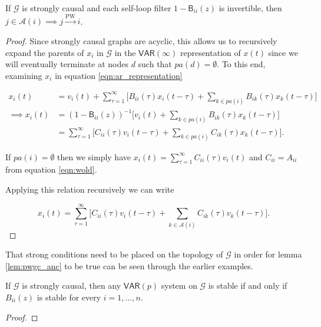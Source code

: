 \documentclass[12pt]{article}
\def\pwgc{\overset{\text{PW}}{\rightarrow}}  %
\def\gcg{\mathcal{G}}  %
\def\VAR{\mathsf{VAR}}  %
\def\B{\mathsf{B}}  %
\newcommand{\pa}[1]{pa(#1)}  %
\newcommand{\anc}[1]{\mathcal{A}(#1)}  %
\begin{document}
\begin{proposition}
  \label{lem:pwgc_anc}
  If $\gcg$ is strongly causal and each self-loop filter
  $1 - \B_{ii}(z)$ is invertible, then $j \in \anc{i} \implies j \pwgc i$.
\end{proposition}
\begin{proof}
  Since strongly causal graphs are acyclic, this allows us to
  recursively expand the parents of $x_i$ in $\gcg$ in the
  $\VAR(\infty)$ representation of $x(t)$ since we will eventually
  terminate at nodes $d$ such that $\pa{d} = \emptyset$.  To this end,
  examining $x_i$ in equation \ref{eqn:ar_representation}

  \begin{align*}
    x_i(t) &= v_i(t) + \sum_{\tau = 1}^\infty \big[ B_{ii}(\tau)x_i(t - \tau) + \sum_{k \in \pa{i}} B_{ik}(\tau)x_k(t - \tau)\big]\\
    \implies x_i(t) &= (1 - \B_{ii}(z))^{-1} \big[v_i(t) + \sum_{k \in \pa{i}} B_{ik}(\tau)x_k(t - \tau) \big]\\
    &= \sum_{\tau = 1}^\infty \big[C_{ii}(\tau)v_i(t - \tau) + \sum_{k \in \pa{i}} C_{ik}(\tau)x_k(t - \tau)\big].
  \end{align*}

  If $\pa{i} = \emptyset$ then we simply have
  $x_i(t) = \sum_{\tau = 1}^\infty C_{ii}(\tau)v_i(t)$ and
  $C_{ii} = A_{ii}$ from equation \ref{eqn:wold}.

  Applying this relation recursively we can write

  \begin{equation*}
    x_i(t) = \sum_{\tau = 1}^\infty\big[C_{ii}(\tau)v_i(t - \tau) + \sum_{k \in \anc{i}}C_{ik}(\tau)v_k(t - \tau) \big].
  \end{equation*}

\end{proof}

That strong conditions need to be placed on the topology of $\gcg$ in
order for lemma \ref{lem:pwgc_anc} to be true can be seen through the
earlier examples.

\begin{lemma}
  If $\gcg$ is strongly causal, then any $\VAR(p)$ system on $\gcg$ is stable if and only if
  $B_{ii}(z)$ is stable for every $i = 1, \ldots, n$.
\end{lemma}
\begin{proof}
\end{proof}

\end{document}
